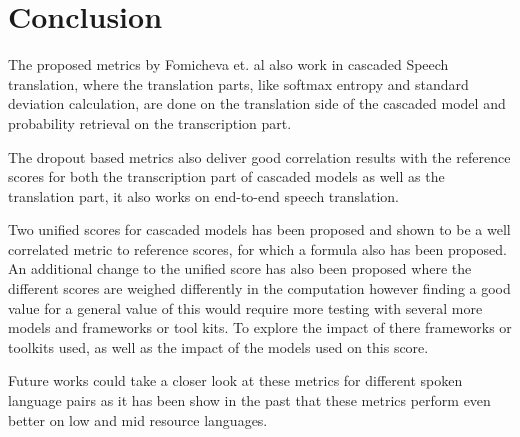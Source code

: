 
\chapter{Conclusion}
\label{ch:Conclusion}
The proposed metrics by Fomicheva et. al \cite{fomicheva2020unsupervised} also work in cascaded Speech translation, where the translation parts, like softmax entropy and standard deviation calculation, are done on the translation side of the cascaded model and probability retrieval on the transcription part. 

The dropout based metrics also deliver good correlation results with the reference scores  for both the transcription part of cascaded models as well as the translation part, it also works on end-to-end speech translation.

Two unified scores for cascaded models has been proposed and shown to be a well correlated metric to reference scores, for which a formula also has been proposed. 
An additional change to the unified score has also been proposed where the different scores are weighed differently in the computation however finding a good value for a general value of this would require more testing with several more models and frameworks or tool kits. To explore the impact of there frameworks or toolkits used, as well as the impact of the models used on this score. 

Future works could take a closer look at these metrics for different spoken language pairs as it has been show in the past that these metrics perform even better on low and mid resource languages. 